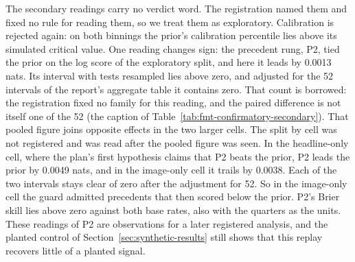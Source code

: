 The secondary readings carry no verdict word. The registration named them and fixed no rule for reading them, so we treat them as exploratory. Calibration is rejected again: on both binnings the prior's calibration percentile lies above its simulated critical value. One reading changes sign: the precedent rung, P2, tied the prior on the log score of the exploratory split, and here it leads by 0.0013 nats. Its interval with tests resampled lies above zero, and adjusted for the 52 intervals of the report's aggregate table it contains zero. That count is borrowed: the registration fixed no family for this reading, and the paired difference is not itself one of the 52 (the caption of Table~\ref{tab:fmt-confirmatory-secondary}). That pooled figure joins opposite effects in the two larger cells. The split by cell was not registered and was read after the pooled figure was seen. In the headline-only cell, where the plan's first hypothesis claims that P2 beats the prior, P2 leads the prior by 0.0049 nats, and in the image-only cell it trails by 0.0038. Each of the two intervals stays clear of zero after the adjustment for 52. So in the image-only cell the guard admitted precedents that then scored below the prior. P2's Brier skill lies above zero against both base rates, also with the quarters as the units. These readings of P2 are observations for a later registered analysis, and the planted control of Section~\ref{sec:synthetic-results} still shows that this replay recovers little of a planted signal.

